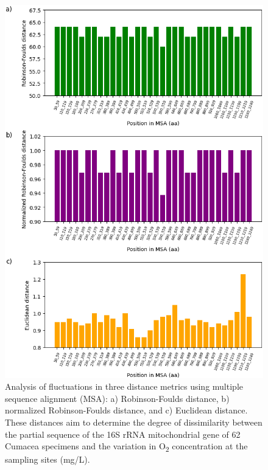 \begin{figure}[h]
    \centering
    \includegraphics[width=\textwidth]{figure6.png}
    \caption{Analysis of fluctuations in three distance metrics using multiple sequence alignment (MSA): a) Robinson-Foulds distance, b) normalized Robinson-Foulds distance, and c) Euclidean distance. These distances aim to determine the degree of dissimilarity between the partial sequence of the 16S rRNA mitochondrial gene of 62 Cumacea specimens and the variation in O\textsubscript{2} concentration at the sampling sites (mg/L). \label{fig:fig8}}
\end{figure}

